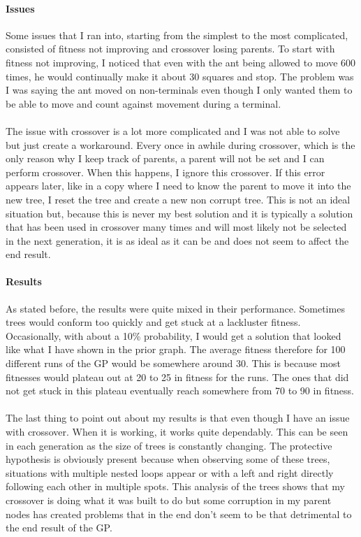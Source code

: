 \documentclass[11pt]{article} %
\begin{document}
\paragraph{Issues} Some issues that I ran into, starting from the simplest to the most complicated, consisted of fitness not improving and crossover losing parents. To start with fitness not improving, I noticed that even with the ant being allowed to move 600 times, he would continually make it about 30 squares and stop. The problem was I was saying the ant moved on non-terminals even though I only wanted them to be able to move and count against movement during a terminal.

\paragraph{} The issue with crossover is a lot more complicated and I was not able to solve but just create a workaround. Every once in awhile during crossover, which is the only reason why I keep track of parents, a parent will not be set and I can perform crossover. When this happens, I ignore this crossover. If this error appears later, like in a copy where I need to know the parent to move it into the new tree, I reset the tree and create a new non corrupt tree. This is not an ideal situation but, because this is never my best solution and it is typically a solution that has been used in crossover many times and will most likely not be selected in the next generation, it is as ideal as it can be and does not seem to affect the end result.

\paragraph{Results} As stated before, the results were quite mixed in their performance. Sometimes trees would conform too quickly and get stuck at a lackluster fitness. Occasionally, with about a 10\% probability, I would get a solution that looked like what I have shown in the prior graph. The average fitness therefore for 100 different runs of the GP would be somewhere around 30. This is because most fitnesses would plateau out at 20 to 25 in fitness for the runs. The ones that did not get stuck in this plateau eventually reach somewhere from 70 to 90 in fitness.

\paragraph{} The last thing to point out about my results is that even though I have an issue with crossover. When it is working, it works quite dependably. This can be seen in each generation as the size of trees is constantly changing. The protective hypothesis is obviously present because when observing some of these trees, situations with multiple nested loops appear or with a left and right directly following each other in multiple spots. This analysis of the trees shows that my crossover is doing what it was built to do but some corruption in my parent nodes has created problems that in the end don't seem to be that detrimental to the end result of the GP.
\end{document}
